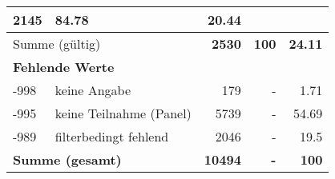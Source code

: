 \begin{longtable}{lXrrr}
       \num{2145} &
       \num[round-mode=places,round-precision=2]{84.78} &
         \num[round-mode=places,round-precision=2]{20.44} \\
     \midrule
     \multicolumn{2}{l}{Summe (gültig)} &
       \textbf{\num{2530}} &
     \textbf{\num{100}} &
       \textbf{\num[round-mode=places,round-precision=2]{24.11}} \\
     \multicolumn{5}{l}{\textbf{Fehlende Werte}}\\
       -998 &
       keine Angabe &
         \num{179} &
        - &
         \num[round-mode=places,round-precision=2]{1.71} \\
       -995 &
       keine Teilnahme (Panel) &
         \num{5739} &
        - &
         \num[round-mode=places,round-precision=2]{54.69} \\
       -989 &
       filterbedingt fehlend &
         \num{2046} &
        - &
         \num[round-mode=places,round-precision=2]{19.5} \\
     \midrule
     \multicolumn{2}{l}{\textbf{Summe (gesamt)}} &
          \textbf{\num{10494}} &
        \textbf{-} &
        \textbf{\num{100}} \\
     \bottomrule
     \end{longtable}
     
